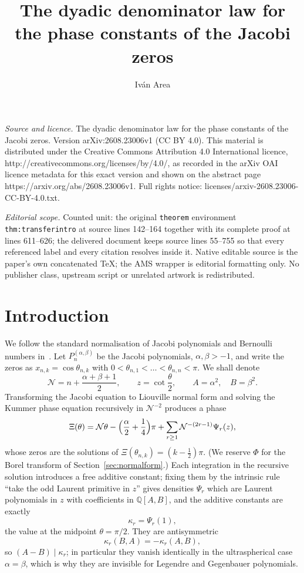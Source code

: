 \documentclass[10pt,a4paper]{amsart}
\newcommand{\Nn}{\mathcal N}
\begin{document}
\title[The dyadic denominator law for the phase constants of the Ja]{The dyadic denominator law for the phase constants of the Jacobi zeros}
\author{Iván Area}
\date{}
\maketitle
\noindent\emph{Source and licence.} The dyadic denominator law for the phase constants of the Jacobi zeros. Version arXiv:2608.23006v1 (CC BY 4.0). This material is distributed under the Creative Commons Attribution 4.0 International licence, http://creativecommons.org/licenses/by/4.0/, as recorded in the arXiv OAI licence metadata for this exact version and shown on the abstract page https://arxiv.org/abs/2608.23006v1. Full rights notice: licenses/arxiv-2608.23006-CC-BY-4.0.txt.\par\smallskip
\noindent\textit{Editorial scope.} Counted unit: the original \texttt{theorem} environment \texttt{thm:transferintro} at source lines 142--164 together with its complete proof at lines 611--626; the delivered document keeps source lines 55--755 so that every referenced label and every citation resolves inside it. Native editable source is the paper's own concatenated TeX; the AMS wrapper is editorial formatting only. No publisher class, upstream script or unrelated artwork is redistributed.
\section{Introduction}

We follow the standard normalisation of Jacobi polynomials and Bernoulli numbers in~\cite{Szego,DLMF}.  Let $P_n^{(\alpha,\beta)}$ be the Jacobi polynomials, $\alpha,\beta>-1$, and write the zeros as $x_{n,k}=\cos\theta_{n,k}$ with $0<\theta_{n,1}<\dots<\theta_{n,n}<\pi$. We shall denote
\[
  \Nn=n+\frac{\alpha+\beta+1}2,\qquad z=\cot\frac\theta2,\qquad   A=\alpha^2,\quad B=\beta^2 .
\]
Transforming the Jacobi equation to Liouville normal form and solving the Kummer phase equation recursively in $\Nn^{-2}$ produces a phase
\begin{equation}\label{eq:phase}
  \Xi(\theta)=\Nn\theta-\Bigl(\frac\alpha2+\frac14\Bigr)\pi   +\sum_{r\ge1}\Nn^{-(2r-1)}\Psi_r(z),
\end{equation}
whose zeros are the solutions of $\Xi(\theta_{n,k})=(k-\frac12)\pi$.  (We reserve $\Phi$ for the Borel transform of Section~\ref{sec:normalform}.)  Each integration in the recursive solution introduces a free additive constant; fixing them by the intrinsic rule ``take the odd Laurent primitive in $z$'' gives densities $\Psi_r$ which are Laurent polynomials in $z$ with coefficients in $\mathbb Q[A,B]$, and the additive constants are exactly
\[
  \kappa_r=\Psi_r(1),
\]
the value at the midpoint $\theta=\pi/2$.  They are antisymmetric
\[
\kappa_r(B,A)=-\kappa_r(A,B), 
\]
so $(A-B)\mid\kappa_r$; in particular they vanish identically in the ultraspherical case $\alpha=\beta$, which is why they are invisible for Legendre and Gegenbauer polynomials.
\end{document}

